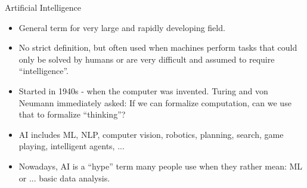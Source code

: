 \documentclass[11pt,compress,t,notes=noshow, xcolor=table]{beamer}
\begin{document}

\begin{frame}{Artificial Intelligence}

\begin{itemize}
	\item General term for very large and rapidly developing field.
	\item No strict definition, but often used when machines perform tasks that could only be solved by humans or are very difficult and assumed to require ``intelligence''.
    \item Started in 1940s - when the computer was invented. 
        Turing and von Neumann immediately asked:
        If we can formalize computation, can we use that to formalize ``thinking''?
	\item AI includes ML, NLP, computer vision, robotics, planning, search, game playing, intelligent agents, ...
    \item Nowadays, AI is a ``hype'' term many people use when they rather mean: ML or ... basic data analysis.
\end{itemize}
  
\end{frame}

\end{document}
